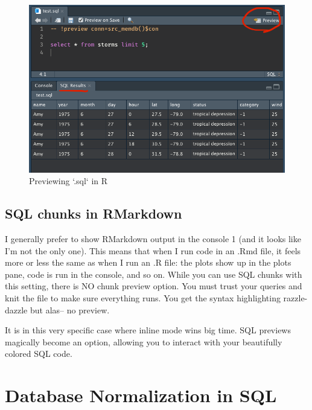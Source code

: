 \documentclass[
]{book}
\begin{document}
\begin{figure}

{\centering \includegraphics[width=1\linewidth]{./images/Bab3/sql-file-preview} 

}

\caption{Previewing `.sql` in R}\label{fig:unnamed-chunk-59}
\end{figure}

\hypertarget{sql-chunks-in-rmarkdown}{%
\section{SQL chunks in RMarkdown}\label{sql-chunks-in-rmarkdown}}

I generally prefer to show RMarkdown output in the console 1 (and it looks like I'm not the only one). This means that when I run code in an .Rmd file, it feels more or less the same as when I run an .R file: the plots show up in the plots pane, code is run in the console, and so on. While you can use SQL chunks with this setting, there is NO chunk preview option. You must trust your queries and knit the file to make sure everything runs. You get the syntax highlighting razzle-dazzle but alas-- no preview.

It is in this very specific case where inline mode wins big time. SQL previews magically become an option, allowing you to interact with your beautifully colored SQL code.

\hypertarget{database-normalization-in-sql}{%
\chapter{Database Normalization in SQL}\label{database-normalization-in-sql}}
\end{document}
